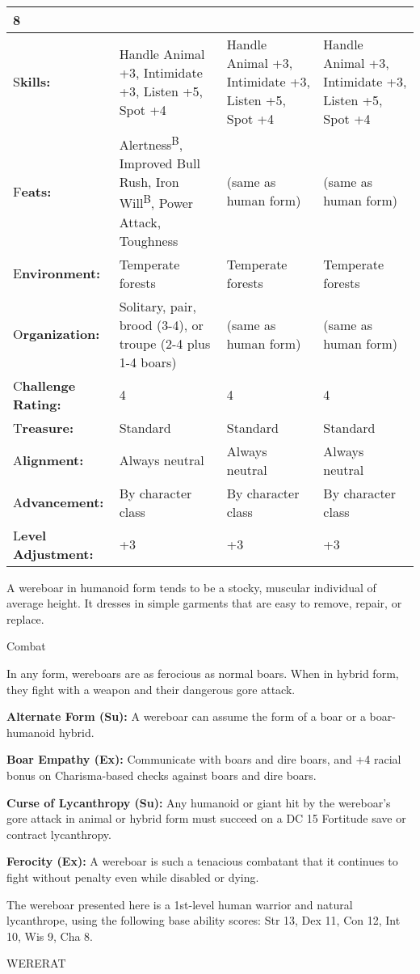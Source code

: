 \documentclass{article}
\begin{document}
\begin{tabular}{|>{\raggedright}p{49pt}|>{\raggedright}p{84pt}|>{\raggedright}p{84pt}|>{\raggedright}p{84pt}|}
8\tabularnewline
\hline
S\textbf{kills:} & Handle Animal +3, Intimidate +3, Listen +5, Spot +4 & Handle 
Animal +3, Intimidate +3, Listen +5, Spot +4 & Handle Animal +3, Intimidate +3, 
Listen +5, Spot +4\tabularnewline
\hline
F\textbf{eats:} & Alertness\textsuperscript{B}, Improved Bull Rush, Iron Will\textsuperscript{B}, 
Power Attack, Toughness & (same as human form) & (same as human form)\tabularnewline
\hline
E\textbf{nvironment:} & Temperate forests & Temperate forests & Temperate forests\tabularnewline
\hline
O\textbf{rganization:} & Solitary, pair, brood (3-4), or troupe (2-4 plus 1-4 boars) & (same 
as human form) & (same as human form)\tabularnewline
\hline
C\textbf{hallenge Rating:} & 4 & 4 & 4\tabularnewline
\hline
T\textbf{reasure:} & Standard & Standard & Standard\tabularnewline
\hline
A\textbf{lignment:} & Always neutral & Always neutral & Always neutral\tabularnewline
\hline
A\textbf{dvancement:} & By character class & By character class & By character 
class\tabularnewline
\hline
L\textbf{evel Adjustment:} & +3 & +3 & +3\tabularnewline
\hline
\end{tabular}

A wereboar in humanoid form tends to be a stocky, muscular individual of average 
height. It dresses in simple garments that are easy to remove, repair, or replace.

Combat

In any form, wereboars are as ferocious as normal boars. When in hybrid form, they 
fight with a weapon and their dangerous gore attack.

\textbf{Alternate Form (Su): }A wereboar can assume the form of a boar or a boar-humanoid 
hybrid.

\textbf{Boar Empathy (Ex):} Communicate with boars and dire boars, and +4 racial 
bonus on Charisma-based checks against boars and dire boars.

\textbf{Curse of Lycanthropy (Su):} Any humanoid or giant hit by the wereboar's 
gore attack in animal or hybrid form must succeed on a DC 15 Fortitude save or 
contract lycanthropy.

\textbf{Ferocity (Ex):} A wereboar is such a tenacious combatant that it continues 
to fight without penalty even while disabled or dying. 

The wereboar presented here is a 1st-level human warrior and natural lycanthrope, 
using the following base ability scores: Str 13, Dex 11, Con 12, Int 10, Wis 9, 
Cha 8.

\vspace{12pt}
WERERAT
\end{document}
